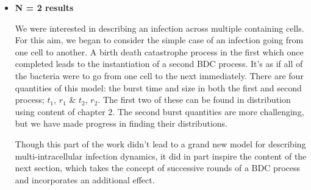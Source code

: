 \begin{itemize}
Over the handful of lucocyte types known to science, most contain packets of toxic material called granuoles (of course, not least, granuolocytes). These generally oxidative substances are employed by the immune cells to attack invading pathogens. The leucocytes of interest in our resreach, macrophages and neutrophils, both contain granuoles. Neutrophils contain more and use them slightly differently, lysing themselves to release the inflamatory packats to the extracellular medium. Whereas macrophages employ the toxic granuoles intracellularly, merging the bags of toxin with phagosomal membranes which harbour pathogen after engulfing has taken place. I believe Neutrophils dothis as well in addition to the lyse method. And it is this dynamic which forms the basis of the model presented here.\par
Basically, picture a leukocyte which has just engulfed some number of pathogen. It also contains a count of toxin containing granules which are assumed to be depleated in the process of being used to kill pathogen. With the model specification as given, it can be shown that the number of incident pathogen has a substantial effect of the survival potential of the infection.   




\item \textbf{N = 2 results}

We were interested in describing an infection across multiple containing cells. For this aim, we began to consider the simple case of an infection going from one cell to another. A birth death catastrophe process in the first which once completed leads to the instantiation of a second BDC process. It's as if all of the bacteria were to go from one cell to the next immediately. There are four quantities of this model: the burst time and size in both the first and second process; $t_1$, $r_1$ \& $t_2$, $r_2$. The first two of these can be found in distribution using content of chapter 2. The second burst quantities are more challenging, but we have made progress in finding their distributions.\par
Though this part of the work didn't lead to a grand new model for describing multi-intracellular infection dynamics, it did in part inspire the content of the next section, which takes the concept of successive rounds of a BDC process and incorporates an additional effect.  







\end{itemize}








